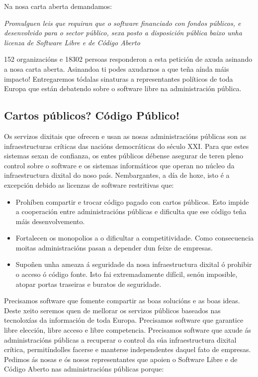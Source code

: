 \documentclass[10pt,foldmark,tumble]{leaflet}
\begin{document}
Na nosa carta aberta demandamos:

\textit{Promulguen leis que requiran que o software financiado con fondos públicos, e desenvolvido para o sector público, sexa posto a disposición pública baixo unha licenza de Software Libre e de Código Aberto}

152 organizacións e 18302 persoas responderon a esta petición de axuda asinando a nosa carta aberta. Asinandoa ti podes axudarnos a que teña aínda máis impacto! Entregaremos tódalas sinaturas a representantes políticos de toda Europa que están debatendo sobre o software libre na administración pública.

\vspace{1em}
  \subsection{ Cartos públicos? Código Público!}
\vspace{.5em}

    Os servizos dixitais que ofrecen e usan as nosas administracións públicas son as infraestructuras críticas das nacións democráticas do século XXI. Para que estes sistemas sexan de confianza, os entes públicos débense asegurar de teren pleno control sobre o software e os sistemas informáticos que operan no núcleo da infraestructura dixital do noso país. Nembargantes, a día de hoxe, isto é a excepción debido as licenzas de software restritivas que:

\begin{itemize}
    \item Prohíben compartir e trocar código pagado con cartos públicos. Esto impide a cooperación entre administracións públicas e dificulta que ese código teña máis desenvolvemento.
    \item Fortalecen os monopolios a o dificultar a competitividade. Como consecuencia moitas administracións pasan a depender dun feixe de empresas.
    \item Supoñen unha ameaza á seguridade da nosa infraestructura dixital ó prohibir o acceso ó código fonte. Isto fai extremadamente difícil, senón imposible, atopar portas traseiras e buratos de seguridade.
\end{itemize}

    Precisamos software que fomente compartir as boas solucións e as boas ideas. Deste xeito seremos quen de mellorar os servizos públicos baseados nas tecnoloxías da información de toda Europa. Precisamos software que garantice libre elección, libre acceso e libre competencia. Precisamos software que axude ás administracións públicas a recuperar o control da súa infraestructura dixital crítica, permitíndolles facerse e manterse independentes daquel fato de empresas. Pedimos ás nosas e ós nosos representantes que apoien o Software Libre e de Código Aberto nas administracións públicas porque:
\end{document}
